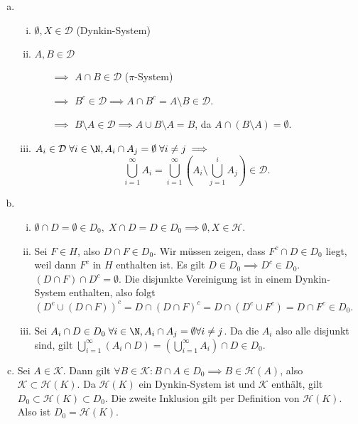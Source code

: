 \documentclass{article}
\begin{document}
    \begin{enumerate}[(a)]
        \item \begin{enumerate}[(i)]
            \item $\emptyset, X \in \mathcal{D}$ (Dynkin-System)
            \item $A, B \in \mathcal{D}$
            \begin{itemize}
                \item[$\implies$] $A\cap B\in \mathcal{D}$ ($\pi$-System)
                \item[$\implies$] $B^c \in \mathcal{D} \implies A \cap B^c = A \setminus B \in \mathcal{D}$.
                \item[$\implies$] $B\setminus A\in \mathcal{D} \implies A \cup B\setminus A = B$, da $A \cap (B\setminus A) = \emptyset$.  
            \end{itemize}
            \item $A_i \in \mathcal{D}\; \forall i \in \N, A_i\cap A_j = \emptyset\; \forall i \neq j \implies$
            \[
                \bigcup_{i=1}^\infty A_i = \bigcup_{i=1}^\infty \left( A_i \setminus\bigcup_{j=1}^i A_j\right) \in \mathcal{D}.
            \]
        \end{enumerate}
        \item \begin{enumerate}[(i)]
            \item $\emptyset \cap D = \emptyset \in D_0,\; X\cap D = D \in D_0 \implies \emptyset, X \in \mathcal{H}$.
            \item Sei $F \in H$, also $D\cap F \in D_0$. Wir müssen zeigen, dass $F^c \cap D \in D_0$ liegt, weil dann $F^c$ in $H$ enthalten ist.
            Es gilt $D \in D_0 \implies D^c \in D_0$.  $(D\cap F) \cap D^c = \emptyset$. Die disjunkte Vereinigung ist in einem Dynkin-System enthalten, also folgt $(D^c \cup (D\cap F))^c = D \cap (D \cap F)^c = D\cap (D^c \cup F^c) = D \cap F^c \in D_0$.
            \item Sei $A_i \cap D \in D_0 \; \forall i \in \N, A_i \cap A_j = \emptyset \forall i \neq j$. Da die $A_i$ also alle disjunkt sind, gilt $\bigcup_{i = 1}^\infty (A_i \cap D) = \left(\bigcup_{i = 1}^\infty A_i\right) \cap D \in D_0$.
        \end{enumerate}
        \item Sei $A \in \mathcal{K}$. Dann gilt $\forall B \in \mathcal{K}: B \cap A \in D_0 \implies B \in \mathcal{H}(A)$, also $\mathcal{K} \subset \mathcal{H}(K)$. Da $\mathcal{H}(K)$ ein Dynkin-System ist und $\mathcal{K}$ enthält, gilt $D_0 \subset \mathcal{H}(K) \subset D_0$. Die zweite Inklusion gilt per Definition von $\mathcal{H}(K)$. Also ist $D_0 = \mathcal{H}(K)$.

\end{enumerate}
\end{document}
